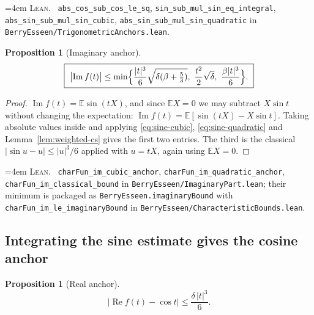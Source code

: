 \documentclass[10pt,a4paper]{article}
\theoremstyle{plain}
\newtheorem{proposition}[theorem]{Proposition}
\theoremstyle{definition}
\newcommand{\E}{\mathbb{E}}
\newcommand{\lean}[1]{\texttt{#1}}
\newcommand{\file}[1]{\texttt{#1}}
\DeclareMathOperator{\Rea}{Re}
\DeclareMathOperator{\Ima}{Im}
\newenvironment{leanref}%
  {\par\addvspace{3pt}\begingroup\sloppy\emergencystretch=4em
   \noindent\footnotesize\textsc{Lean.}\ \ignorespaces}%
  {\par\endgroup\addvspace{3pt}}
\begin{document}
\begin{leanref}
\lean{abs\_cos\_sub\_cos\_le\_sq}, \lean{sin\_sub\_mul\_sin\_eq\_integral},
\lean{abs\_sin\_sub\_mul\_sin\_cubic},
\lean{abs\_sin\_sub\_mul\_sin\_quadratic} in
\file{BerryEsseen/TrigonometricAnchors.lean}.
\end{leanref}

\begin{proposition}[Imaginary anchor]\label{prop:imag}
\begin{equation}\label{eq:imag}
  \boxed{\ \bigl|\Ima f(t)\bigr| \le
  \min\Bigl\{
    \frac{|t|^3}{6}\sqrt{\delta(\beta+\tfrac53)},\
    \frac{t^2}{2}\sqrt{\delta},\
    \frac{\beta|t|^3}{6}
  \Bigr\}.\ }
\end{equation}
\end{proposition}

\begin{proof}
$\Ima f(t)=\E\sin(tX)$, and since $\E X=0$ we may subtract $X\sin t$ without
changing the expectation:
$\Ima f(t)=\E[\sin(tX)-X\sin t]$. Taking absolute values inside and applying
\eqref{eq:sine-cubic}, \eqref{eq:sine-quadratic} and
Lemma~\ref{lem:weighted-cs} gives the first two entries. The third is the
classical $|\sin u-u|\le|u|^3/6$ applied with $u=tX$, again using $\E X=0$.
\end{proof}

\begin{leanref}
\lean{charFun\_im\_cubic\_anchor}, \lean{charFun\_im\_quadratic\_anchor},
\lean{charFun\_im\_classical\_bound} in \file{BerryEsseen/ImaginaryPart.lean};
their minimum is packaged as \lean{BerryEsseen.imaginaryBound} with
\lean{charFun\_im\_le\_imaginaryBound} in
\file{BerryEsseen/CharacteristicBounds.lean}.
\end{leanref}

\subsection{Integrating the sine estimate gives the cosine anchor}

\begin{proposition}[Real anchor]\label{prop:real}
\begin{equation}\label{eq:real}
  \boxed{\ \bigl|\Rea f(t) - \cos t\bigr| \le \frac{\delta\,|t|^3}{6}.\ }
\end{equation}
\end{proposition}
\end{document}
